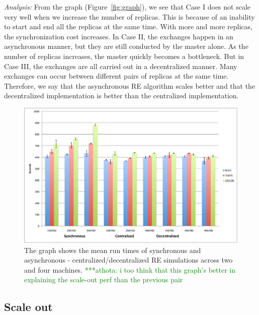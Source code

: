 \documentclass{rspublic}
\newcommand{\athotanote}[1]{ {\textcolor{green} { ***athota: #1 }}}
\newcommand{\athotanote}[1]{}
\begin{document}
{\it Analysis: } From the graph (Figure~\ref{fig:graph}), we see that
Case I does not scale very well when we increase the number of
replicas. This is because of an inability to start and end all the
replicas at the same time. With more and more replicas, the
synchronization cost increases.  In Case II, the exchanges happen in
an asynchronous manner, but they are still conducted by the master
alone. As the number of replicas increases, the master quickly becomes
a bottleneck. But in Case III, the exchanges are all carried out in a
decentralized manner. Many exchanges can occur between different pairs
of replicas at the same time. Therefore, we say that the asynchronous
RE algorithm scales better and that the decentralized implementation
is better than the centralized implementation.

%
\begin{figure}
\centering
\includegraphics[scale=0.60]{../data/scaleout.pdf}
\caption{\small The graph shows the mean run times of synchronous and
  asynchronous - centralized/decentralized RE simulations across two
  and four machines.\athotanote{i too think that this graph's better
    in explaining the scale-out perf than the previous pair} }
\label{fig:2machines}
\vspace{-1em}
\end{figure}

\subsection{Scale out}
\end{document}

